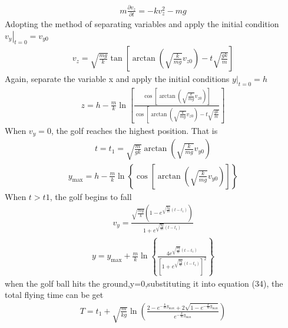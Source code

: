 \begin{align}
    m \frac{\partial v_{z}}{\partial t}=-k v_{z}^{2}-m g
\end{align}
Adopting the method of separating variables and apply the initial condition $\left.v_{y}\right|_{t=0}=v_{y 0}$
\begin{align}
    v_{z}=\sqrt{\frac{m g}{k}} \tan \left[\arctan \left(\sqrt{\frac{k}{m g}} v_{z 0}\right)-t \sqrt{\frac{g k}{m}}\right]
\end{align}
Again, separate the variable x and apply the initial conditions $\left.y\right|_{t=0}=h$
\begin{align}
    z=h-\frac{m}{k} \ln \left[\frac{\cos \left[\arctan \left(\sqrt{\frac{k}{m g}} v_{z 0}\right)\right]}{\cos \left[\arctan \left(\sqrt{\frac{k}{m g}} v_{z 0}\right)-t \sqrt{\frac{g k}{m}}\right.}\right]
\end{align}
When $v_{y}=0$, the golf reaches the highest position. That is
\begin{align}
    t=t_{1}=\sqrt{\frac{m}{g k}} \arctan \left(\sqrt{\frac{k}{m g}} v_{y 0}\right)
\end{align}
\begin{align}
    y_{\max }=h-\frac{m}{k} \ln \left\{\cos \left[\arctan \left(\sqrt{\frac{k}{m g}} v_{y 0}\right)\right]\right\}
\end{align}
When $t>t 1$, the golf begins to fall
\begin{align}
    v_{y}=\frac{\sqrt{\frac{m g}{k}}\left(1-e^{\sqrt{\frac{k g}{m}}\left(t-t_{1}\right)}\right)}{1+e^{\sqrt{\frac{k g}{m}}\left(t-t_{1}\right)}}
\end{align}
\begin{align}
    y=y_{\max }+\frac{m}{k} \ln \left\{\frac{4 e^{\sqrt{\frac{k g}{m}}\left(t-t_{1}\right)}}{\left[1+e^{\sqrt{\frac{k g}{m}}\left(t-t_{1}\right)}\right]^{2}}\right\}
\end{align}
when the golf ball hits the ground,y=0,substituting it into equation (34), the total flying time can be get
\begin{align}
    T=t_{1}+\sqrt{\frac{m}{k g}} \ln \left(\frac{2-e^{-\frac{k}{m} y_{\max }}+2 \sqrt{1-e^{-\frac{k}{m} y_{\max }}}}{e^{-\frac{k}{m} y_{\max }}}\right)
\end{align}
\newpage
